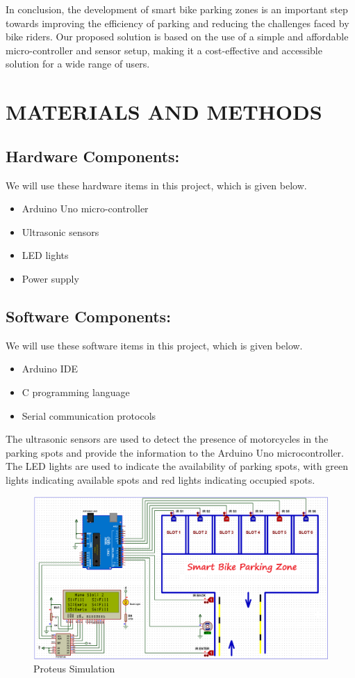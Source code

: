 \documentclass[conference]{IEEEtran}
\begin{document}
	In conclusion, the development of smart bike parking zones is an important step towards improving the efficiency of parking and reducing the challenges faced by bike riders. Our proposed solution is based on the use of a simple and affordable micro-controller and sensor setup, making it a cost-effective and accessible solution for a wide range of users.
	
	\section{MATERIALS AND METHODS}
	

	\subsection{Hardware Components:}
		 We will use these hardware items in this project, which is given below.

	\begin{itemize}
	\item Arduino Uno micro-controller
	\item Ultrasonic sensors
	\item LED lights
	\item Power supply
	\end{itemize}
	
	\subsection{Software Components:} 
		We will use these software items in this project, which is given below.
	
	\begin{itemize}
		\item Arduino IDE
		\item C programming language
		\item Serial communication protocols
	\end{itemize}
The ultrasonic sensors are used to detect the presence of motorcycles in the parking spots and provide the information to the Arduino Uno microcontroller. The LED lights are used to indicate the availability of parking spots, with green lights indicating available spots and red lights indicating occupied spots.
\begin{figure}[htbp]
	\centerline{\includegraphics[scale=0.25]{Proteus Simulation.png}}
	\caption{Proteus Simulation}
	\label{fig}
\end{figure}
\end{document}
